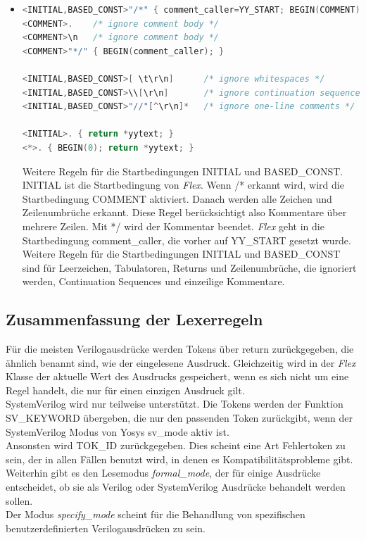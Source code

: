\documentclass[11pt]{report}
\begin{document}
\begin{itemize}
\item
\begin{lstlisting}[language=C++]
<INITIAL,BASED_CONST>"/*" { comment_caller=YY_START; BEGIN(COMMENT); }
<COMMENT>.    /* ignore comment body */
<COMMENT>\n   /* ignore comment body */
<COMMENT>"*/" { BEGIN(comment_caller); }

<INITIAL,BASED_CONST>[ \t\r\n]		/* ignore whitespaces */
<INITIAL,BASED_CONST>\\[\r\n]		/* ignore continuation sequence */
<INITIAL,BASED_CONST>"//"[^\r\n]*	/* ignore one-line comments */

<INITIAL>. { return *yytext; }
<*>. { BEGIN(0); return *yytext; }
\end{lstlisting}
Weitere Regeln für die Startbedingungen INITIAL und BASED\_CONST. INITIAL ist die Startbedingung von \textit{Flex}. Wenn /* erkannt wird, wird die Startbedingung COMMENT aktiviert. Danach werden alle Zeichen und Zeilenumbrüche erkannt. Diese Regel berücksichtigt also Kommentare über mehrere Zeilen. Mit */ wird der Kommentar beendet. \textit{Flex} geht in die Startbedingung comment\_caller, die vorher auf YY\_START gesetzt wurde.\\
Weitere Regeln für die Startbedingungen INITIAL und BASED\_CONST sind für Leerzeichen, Tabulatoren, Returns und Zeilenumbrüche, die ignoriert werden, Continuation Sequences und einzeilige Kommentare.

\end{itemize} 


\subsection{Zusammenfassung der Lexerregeln}
Für die meisten Verilogausdrücke werden Tokens über return zurückgegeben, die ähnlich benannt sind, wie der eingelesene Ausdruck. Gleichzeitig wird in der \textit{Flex} Klasse der aktuelle Wert des Ausdrucks gespeichert, wenn es sich nicht um eine Regel handelt, die nur für einen einzigen Ausdruck gilt.
\\
SystemVerilog wird nur teilweise unterstützt. Die Tokens werden der Funktion SV\_KEYWORD übergeben, die nur den passenden Token zurückgibt, wenn der SystemVerilog Modus von Yosys sv\_mode aktiv ist.\\
Ansonsten wird TOK\_ID zurückgegeben. Dies scheint eine Art Fehlertoken zu sein, der in allen Fällen benutzt wird, in denen es Kompatibilitätsprobleme gibt.
\\
Weiterhin gibt es den Lesemodus \textit{formal\_mode}, der für einige Ausdrücke entscheidet, ob sie als Verilog oder SystemVerilog Ausdrücke behandelt werden sollen. 
\\
Der Modus \textit{specify\_mode} scheint für die Behandlung von spezifischen benutzerdefinierten Verilogausdrücken zu sein.
\end{document}
